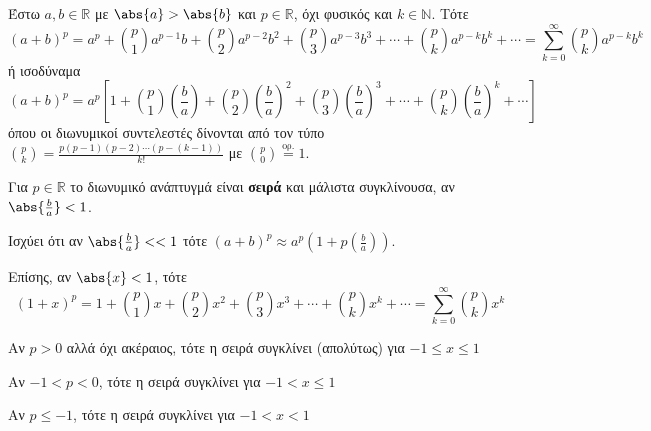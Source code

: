 \documentclass[a4paper,table]{report}
\begin{document}
Έστω $ a,b \in \mathbb{R} $ με $ \abs{a} > \abs{b} $ και $ p \in \mathbb{R} $, όχι
φυσικός και $ k \in \mathbb{N} $. Τότε
\[
  \boxed{(a+b)^{p} = a^{p} + \binom{p}{1} a^{p-1}b + \binom{p}{2} a^{p-2}b^{2} +
    \binom{p}{3} a^{p-3}b^{3} + \cdots + \binom{p}{k} a^{p-k}b^{k} + \cdots =
  \sum_{k=0}^{\infty} \binom{p}{k} a^{p-k}b^{k}}
\] 
ή ισοδύναμα
\[
  (a+b)^{p} = a^{p}\left[1 + \binom{p}{1} \left(\frac{b}{a}\right)+ \binom{p}{2} 
    \left(\frac{b}{a}\right)^{2}+ \binom{p}{3} \left(\frac{b}{ a}\right)^{3}+ \cdots + 
  \binom{p}{k} \left(\frac{b}{a}\right)^{k}+ \cdots\right]
\] 
όπου οι διωνυμικοί συντελεστές δίνονται από τον τύπο
$
\binom{p}{k} = \frac{p(p-1)(p-2)\cdots (p-(k-1))}{k!} 
$ με $ \binom{p}{0} \overset{\text{ορ.}}{=} 1 $.
\begin{rem}
\item {}
  Για $ p \in \mathbb{R} $ το διωνυμικό ανάπτυγμά είναι \textbf{σειρά}
  και μάλιστα συγκλίνουσα, αν $ \abs{\frac{b}{a}} < 1 $. 

  Ισχύει ότι αν $ \abs{\frac{b}{a}} < < 1  $ τότε  
  $ (a+b)^{p} \approx a^{p}\left(1+p\left(\frac{b}{a}\right)\right)  $. 
\end{rem}
Επίσης, αν $ \abs{x} < 1 $, τότε
\[
  \boxed{(1+x)^{p} = 
   1 + \binom{p}{1} x + \binom{p}{2} x^{2} + \binom{p}{3} x^{3} + 
  \cdots + \binom{p}{k} x^{k} + \cdots = 
  \sum_{k=0}^{\infty} \binom{p}{k} x^{k}}
\]
\begin{rem}
\item {}
  \begin{myitemize}
    \item Αν $ p>0 $ αλλά όχι ακέραιος, τότε η σειρά συγκλίνει (απολύτως) για $ -1 \leq x
      \leq 1 $
    \item Αν $-1<p<0$, τότε η σειρά συγκλίνει για $ -1 < x \leq 1 $
    \item Αν $p \leq -1$, τότε η σειρά συγκλίνει για $ -1 < x < 1 $
  \end{myitemize}
\end{rem}
\end{document}
